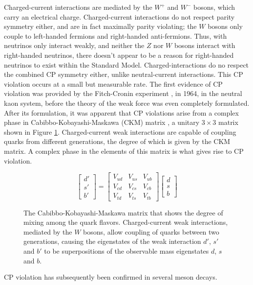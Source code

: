\documentclass[12pt,a4paper,openright,twoside]{report}
\begin{document}
Charged-current interactions are mediated by the $W^+$ and $W^-$ bosons, which carry an electrical charge. Charged-current interactions do not respect parity symmetry either, and are in fact maximally parity violating; the $W$ bosons only couple to left-handed fermions and right-handed anti-fermions. Thus, with neutrinos only interact weakly, and neither the $Z$ nor $W$ bosons interact with right-handed neutrinos, there doesn't appear to be a reason for right-handed neutrinos to exist within the Standard Model. Charged-interactions do no respect the combined CP symmetry either, unlike neutral-current interactions. This CP violation occurs at a small but measurable rate. The first evidence of CP violation was provided by the Fitch-Cronin experiment \cite{cronin_fitch}, in 1964, in the neutral kaon system, before the theory of the weak force was even completely formulated. After its formulation, it was apparent that CP violations arise from a complex phase in Cabibbo-Kobayashi-Maskawa (CKM) matrix \cite{CKM}, a unitary $3\times 3$ matrix shown in Figure \ref{fig:CKM matrix}. Charged-current weak interactions are capable of coupling quarks from different generations, the degree of which is given by the CKM matrix. A complex phase in the elements of this matrix is what gives rise to CP violation.
\begin{figure}[H]
\[
\begin{bmatrix}
d'\\
s'\\
b'
\end{bmatrix}
=
\begin{bmatrix}
V_{ud} & V_{us} & V_{ub}\\
V_{cd} & V_{cs} & V_{cb}\\
V_{td} & V_{ts} & V_{tb}
\end{bmatrix}
\begin{bmatrix}
d\\
s\\
b
\end{bmatrix}
\]
\caption{The Cabibbo-Kobayashi-Maskawa matrix that shows the degree of mixing among the quark flavors. Charged-current weak interactions, mediated by the $W$ bosons, allow coupling of quarks between two generations, causing the eigenstates of the weak interaction $d'$, $s'$ and $b'$ to be superpositions of the observable mass eigenstates $d$, $s$ and $b$.}
\label{fig:CKM matrix}
\end{figure}
CP violation has subsequently been confirmed in several meson decays\cite{CP1,CP2,CP3,CP4,CP5,CP6}.
\end{document}
